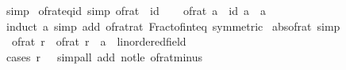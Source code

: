 \begin{isabellebody}
\ simp%
\endisatagproof
{\isafoldproof}%
%
\isadelimproof
\isanewline
%
\endisadelimproof
\isanewline
{}\isamarkupfalse%
\ of{\isacharunderscore}{\kern0pt}rat{\isacharunderscore}{\kern0pt}eq{\isacharunderscore}{\kern0pt}id\ {\isacharbrackleft}{\kern0pt}simp{\isacharbrackright}{\kern0pt}{\isacharcolon}{\kern0pt}\ {\isachardoublequoteopen}of{\isacharunderscore}{\kern0pt}rat\ {\isacharequal}{\kern0pt}\ id{\isachardoublequoteclose}\isanewline
%
\isadelimproof
%
\endisadelimproof
%
\isatagproof
{}\isamarkupfalse%
\isanewline
\ \ \isamarkupfalse%
\ {\isachardoublequoteopen}of{\isacharunderscore}{\kern0pt}rat\ a\ {\isacharequal}{\kern0pt}\ id\ a{\isachardoublequoteclose}\ \ a\isanewline
\ \ \ \ \isamarkupfalse%
\ {\isacharparenleft}{\kern0pt}induct\ a{\isacharparenright}{\kern0pt}\ {\isacharparenleft}{\kern0pt}simp\ add{\isacharcolon}{\kern0pt}\ of{\isacharunderscore}{\kern0pt}rat{\isacharunderscore}{\kern0pt}rat\ Fract{\isacharunderscore}{\kern0pt}of{\isacharunderscore}{\kern0pt}int{\isacharunderscore}{\kern0pt}eq\ {\isacharbrackleft}{\kern0pt}symmetric{\isacharbrackright}{\kern0pt}{\isacharparenright}{\kern0pt}\isanewline
{}\isamarkupfalse%
%
\endisatagproof
{\isafoldproof}%
%
\isadelimproof
\isanewline
%
\endisadelimproof
\isanewline
{}\isamarkupfalse%
\ abs{\isacharunderscore}{\kern0pt}of{\isacharunderscore}{\kern0pt}rat\ {\isacharbrackleft}{\kern0pt}simp{\isacharbrackright}{\kern0pt}{\isacharcolon}{\kern0pt}\isanewline
\ \ {\isachardoublequoteopen}{\isasymbar}of{\isacharunderscore}{\kern0pt}rat\ r{\isasymbar}\ {\isacharequal}{\kern0pt}\ {\isacharparenleft}{\kern0pt}of{\isacharunderscore}{\kern0pt}rat\ {\isasymbar}r{\isasymbar}\ {\isacharcolon}{\kern0pt}{\isacharcolon}{\kern0pt}\ {\isacharprime}{\kern0pt}a\ {\isacharcolon}{\kern0pt}{\isacharcolon}{\kern0pt}\ linordered{\isacharunderscore}{\kern0pt}field{\isacharparenright}{\kern0pt}{\isachardoublequoteclose}\isanewline
%
\isadelimproof
\ \ %
\endisadelimproof
%
\isatagproof
{}\isamarkupfalse%
\ {\isacharparenleft}{\kern0pt}cases\ {\isachardoublequoteopen}r\ {\isasymge}\ {}{\isachardoublequoteclose}{\isacharparenright}{\kern0pt}\ {\isacharparenleft}{\kern0pt}simp{\isacharunderscore}{\kern0pt}all\ add{\isacharcolon}{\kern0pt}\ not{\isacharunderscore}{\kern0pt}le\ of{\isacharunderscore}{\kern0pt}rat{\isacharunderscore}{\kern0pt}minus{\isacharparenright}{\kern0pt}%
\endisatagproof
{\isafoldproof}%
%
\isadelimproof
%
\endisadelimproof
%
\begin{isamarkuptext}%

\end{isamarkuptext}
\end{isabellebody}
